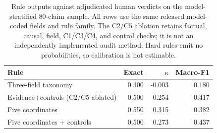 \begin{table}[t]
\centering
\small
\setlength{\tabcolsep}{4pt}
\begin{tabularx}{\columnwidth}{Xrrr}
\toprule
\textbf{Rule} & \textbf{Exact} & \textbf{$\kappa$} & \textbf{Macro-F1} \\
\midrule
Three-field taxonomy & 0.300 & -0.003 & 0.180 \\
Evidence+controls (C2/C5 ablated) & 0.500 & 0.254 & 0.417 \\
Five coordinates & 0.550 & 0.315 & 0.382 \\
Five coordinates + controls & 0.500 & 0.273 & 0.437 \\
\bottomrule
\end{tabularx}
\caption{Rule outputs against adjudicated human verdicts on the
model-stratified 80-claim sample. All rows use the same released model-coded
fields and rule family. The C2/C5 ablation retains factual, causal, field,
C1/C3/C4, and control checks; it is not an independently implemented audit
method. Hard rules emit no probabilities, so calibration is not estimable.}
\label{tab:main-rule-reliability}
\end{table}
